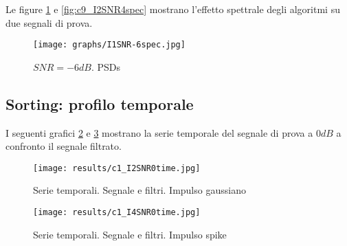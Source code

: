 \documentclass[9pt,twocolumn,twoside]{osajnl}
\begin{document}
Le figure \ref{fig:c9_I5SNR4spec} e \ref{fig:c9_I2SNR4spec} mostrano l'effetto spettrale degli algoritmi su due segnali di prova.
%
\begin{figure}[htbp]
\centering
\texttt{[image: graphs/I1SNR-6spec.jpg]}
\caption{$SNR = -6dB$. PSDs}
\label{fig:c9_I5SNR4spec}
\end{figure}
%






\subsection{Sorting: profilo temporale}

I seguenti grafici \ref{fig:c1_I2SNR0time} e \ref{fig:c1_I4SNR0time} mostrano la serie temporale del segnale di prova a $0dB$ a confronto il segnale filtrato.


\begin{figure}[htbp]
\centering
\texttt{[image: results/c1\_I2SNR0time.jpg]}
\caption{Serie temporali. Segnale e filtri. Impulso gaussiano}
\label{fig:c1_I2SNR0time}
\end{figure}

\begin{figure}[htbp]
\centering
\texttt{[image: results/c1\_I4SNR0time.jpg]}
\caption{Serie temporali. Segnale e filtri. Impulso spike}
\label{fig:c1_I4SNR0time}
\end{figure}
\end{document}

